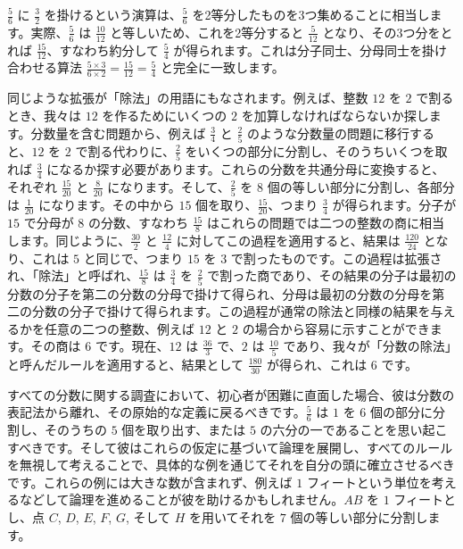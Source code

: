 \documentclass[a4paper,11pt,openany]{ltjsbook}
\newcommand{\Figure}[2][]{}
\begin{document}
$\frac{5}{6}$ に $\frac{3}{2}$ を掛けるという演算は、$\frac{5}{6}$ を2等分したものを3つ集めることに相当します。実際、$\frac{5}{6}$ は $\frac{10}{12}$ と等しいため、これを2等分すると $\frac{5}{12}$ となり、その3つ分をとれば $\frac{15}{12}$、すなわち約分して $\frac{5}{4}$ が得られます。これは分子同士、分母同士を掛け合わせる算法 $\frac{5 \times 3}{6 \times 2} = \frac{15}{12} = \frac{5}{4}$ と完全に一致します。

同じような拡張が「除法」の用語にもなされます。例えば、整数 $12$ を $2$ で割るとき、我々は $12$ を作るためにいくつの $2$ を加算しなければならないか探します。分数量を含む問題から、例えば $\frac{3}{4}$ と $\frac{2}{5}$ のような分数量の問題に移行すると、$12$ を $2$ で割る代わりに、$\frac{2}{5}$ をいくつの部分に分割し、そのうちいくつを取れば $\frac{3}{4}$ になるか探す必要があります。これらの分数を共通分母に変換すると、それぞれ $\frac{15}{20}$ と $\frac{8}{20}$ になります。そして、$\frac{2}{5}$ を $8$ 個の等しい部分に分割し、各部分は $\frac{1}{20}$ になります。その中から $15$ 個を取り、$\frac{15}{20}$、つまり $\frac{3}{4}$ が得られます。分子が $15$ で分母が $8$ の分数、すなわち $\frac{15}{8}$ はこれらの問題では二つの整数の商に相当します。同じように、$\frac{30}{2}$ と $\frac{12}{4}$ に対してこの過程を適用すると、結果は $\frac{120}{24}$ となり、これは $5$ と同じで、つまり $15$ を $3$ で割ったものです。この過程は拡張され、「除法」と呼ばれ、$\frac{15}{8}$ は $\frac{3}{4}$ を $\frac{2}{5}$ で割った商であり、その結果の分子は最初の分数の分子を第二の分数の分母で掛けて得られ、分母は最初の分数の分母を第二の分数の分子で掛けて得られます。この過程が通常の除法と同様の結果を与えるかを任意の二つの整数、例えば $12$ と $2$ の場合から容易に示すことができます。その商は $6$ です。現在、$12$ は $\frac{36}{3}$ で、$2$ は $\frac{10}{5}$ であり、我々が「分数の除法」と呼んだルールを適用すると、結果として $\frac{180}{30}$ が得られ、これは $6$ です。

すべての分数に関する調査において、初心者が困難に直面した場合、彼は分数の表記法から離れ、その原始的な定義に戻るべきです。$\frac{5}{6}$ は $1$ を $6$ 個の部分に分割し、そのうちの $5$ 個を取り出す、または $5$ の六分の一であることを思い起こすべきです。そして彼はこれらの仮定に基づいて論理を展開し、すべてのルールを無視して考えることで、具体的な例を通じてそれを自分の頭に確立させるべきです。これらの例には大きな数が含まれず、例えば $1$ フィートという単位を考えるなどして論理を進めることが彼を助けるかもしれません。$AB$ を $1$ フィートとし、点 $C$, $D$, $E$, $F$, $G$, そして $H$ を用いてそれを $7$ 個の等しい部分に分割します。\Figure[nolabel]{040}
\end{document}
